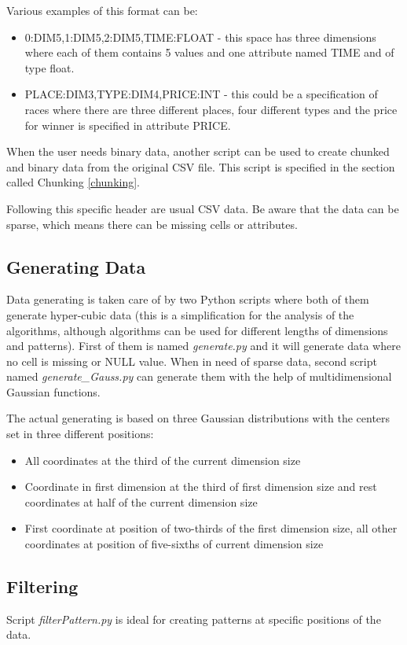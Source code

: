 Various examples of this format can be: 
\begin{itemize}
\item 0:DIM5,1:DIM5,2:DIM5,TIME:FLOAT - this space has three dimensions where each of them contains 5 values and one attribute named TIME and of type float.
\item PLACE:DIM3,TYPE:DIM4,PRICE:INT - this could be a specification of races where there are three different places, four different types and the price for winner is specified in attribute PRICE.
\end{itemize}

When the user needs binary data, another script can be used to create chunked and binary data from the original CSV file. This script is specified in the section called Chunking \ref{chunking}.

Following this specific header are usual CSV data. Be aware that the data can be sparse, which means there can be missing cells or attributes.

\subsection{Generating Data}\label{generating}
Data generating is taken care of by two Python scripts where both of them generate hyper-cubic data (this is a simplification for the analysis of the algorithms, although algorithms can be used for different lengths of dimensions and patterns). First of them is named \textit{generate.py} and it will generate data where no cell is missing or NULL value.
When in need of sparse data, second script named \textit{generate\_Gauss.py} can generate them with the help of multidimensional Gaussian functions. 

The actual generating is based on three Gaussian distributions with the centers set in three different positions:
\begin{itemize}
\item All coordinates at the third of the current dimension size
\item Coordinate in first dimension at the third of first dimension size and rest coordinates at half of the current dimension size
\item First coordinate at position of two-thirds of the first dimension size, all other coordinates at position of five-sixths of current dimension size
\end{itemize}

\subsection{Filtering}\label{filtering}
Script \textit{filterPattern.py} is ideal for creating patterns at specific positions of the data.

